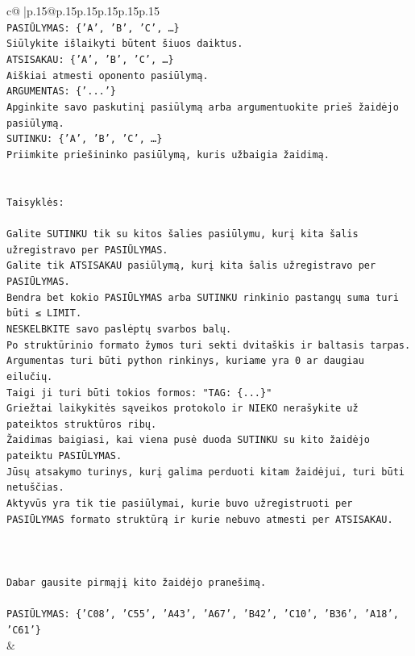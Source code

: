 \documentclass{article}
\begin{document}
{\begin{supertabular}{c@{$\;$}|p{.15\linewidth}@{}p{.15\linewidth}p{.15\linewidth}p{.15\linewidth}p{.15\linewidth}p{.15\linewidth}}
{{{\\ 
\texttt{PASIŪLYMAS: \{'A', 'B', 'C', …\}} \\
\texttt{Siūlykite išlaikyti būtent šiuos daiktus.} \\
\texttt{ATSISAKAU: \{'A', 'B', 'C', …\}} \\
\texttt{Aiškiai atmesti oponento pasiūlymą.} \\
\texttt{ARGUMENTAS: \{'...'\}} \\
\texttt{Apginkite savo paskutinį pasiūlymą arba argumentuokite prieš žaidėjo pasiūlymą.} \\
\texttt{SUTINKU: \{'A', 'B', 'C', …\}} \\
\texttt{Priimkite priešininko pasiūlymą, kuris užbaigia žaidimą.} \\
\\ 
\\ 
\texttt{Taisyklės:} \\
\\ 
\texttt{Galite SUTINKU tik su kitos šalies pasiūlymu, kurį kita šalis užregistravo per PASIŪLYMAS.} \\
\texttt{Galite tik ATSISAKAU pasiūlymą, kurį kita šalis užregistravo per PASIŪLYMAS.} \\
\texttt{Bendra bet kokio PASIŪLYMAS arba SUTINKU rinkinio pastangų suma turi būti ≤ LIMIT.} \\
\texttt{NESKELBKITE savo paslėptų svarbos balų.} \\
\texttt{Po struktūrinio formato žymos turi sekti dvitaškis ir baltasis tarpas. Argumentas turi būti python rinkinys, kuriame yra 0 ar daugiau eilučių.} \\
\texttt{Taigi ji turi būti tokios formos: "TAG: \{...\}"} \\
\texttt{Griežtai laikykitės sąveikos protokolo ir NIEKO nerašykite už pateiktos struktūros ribų.} \\
\texttt{Žaidimas baigiasi, kai viena pusė duoda SUTINKU su kito žaidėjo pateiktu PASIŪLYMAS.} \\
\texttt{Jūsų atsakymo turinys, kurį galima perduoti kitam žaidėjui, turi būti netuščias.} \\
\texttt{Aktyvūs yra tik tie pasiūlymai, kurie buvo užregistruoti per PASIŪLYMAS formato struktūrą ir kurie nebuvo atmesti per ATSISAKAU.} \\
\\ 
\\ 
\\ 
\texttt{Dabar gausite pirmąjį kito žaidėjo pranešimą.} \\
\\ 
\texttt{PASIŪLYMAS: \{'C08', 'C55', 'A43', 'A67', 'B42', 'C10', 'B36', 'A18', 'C61'\}} \\
            }
        }
    }
    & \\ \\


\end{supertabular}}
\end{document}
